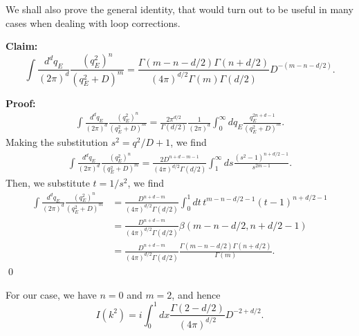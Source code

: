 We shall also prove the general identity, that would turn out to be useful in many cases when dealing with loop corrections.

\noindent \textbf{Claim:}
\begin{equation}
    \int\frac{d^dq_E}{(2\pi)^d}\frac{(q_E^2)^n}{(q_E^2+D)^{m}} = \frac{\Gamma(m-n-d/2)\Gamma(n+d/2)}{(4\pi)^{d/2}\Gamma(m)\Gamma(d/2)}D^{-(m-n-d/2)}.
\end{equation}

\noindent \textbf{Proof:}
\begin{equation}
    \begin{aligned}
        \int\frac{d^dq_E}{(2\pi)^d}\frac{(q_E^2)^n}{(q_E^2+D)^{m}} = \frac{2\pi^{d/2}}{\Gamma(d/2)}\frac{1}{(2\pi)^d}\int_0^\infty dq_E\frac{q_E^{2n+d-1}}{(q_E^2+D)^m}.
    \end{aligned}
\end{equation}
Making the substitution $s^2 = q^2/D +1$, we find
\begin{equation}
        \begin{aligned}
        \int\frac{d^dq_E}{(2\pi)^d}\frac{(q_E^2)^n}{(q_E^2+D)^{m}} = \frac{2D^{n+d-m-1}}{(4\pi)^{d/2}\Gamma(d/2)}\int^\infty_1ds \frac{(s^2-1)^{n+d/2-1}}{s^{2m-1}}.
    \end{aligned}
\end{equation}
Then, we substitute $t = 1/s^2$, we find
\begin{equation}
\begin{aligned}
    \int\frac{d^dq_E}{(2\pi)^d}\frac{(q_E^2)^n}{(q_E^2+D)^{m}} &= \frac{D^{n+d-m}}{(4\pi)^{d/2}\Gamma(d/2)}\int^1_0 dt\, t^{m-n-d/2-1}(t-1)^{n+d/2-1}\\
    &=\frac{D^{n+d-m}}{(4\pi)^{d/2}\Gamma(d/2)}\beta(m-n-d/2,n+d/2-1)\\
    &=\frac{D^{n+d-m}}{(4\pi)^{d/2}\Gamma(d/2)}\frac{\Gamma(m-n-d/2)\Gamma(n+d/2)}{\Gamma(m)}.
\end{aligned}
\end{equation}
\qed

For our case, we have $n=0$ and $m=2$, and hence
\begin{equation}
    I(k^2) = i \int^1_0dx\frac{\Gamma(2-d/2)}{(4\pi)^{d/2}}D^{-2+d/2}.
\end{equation}

